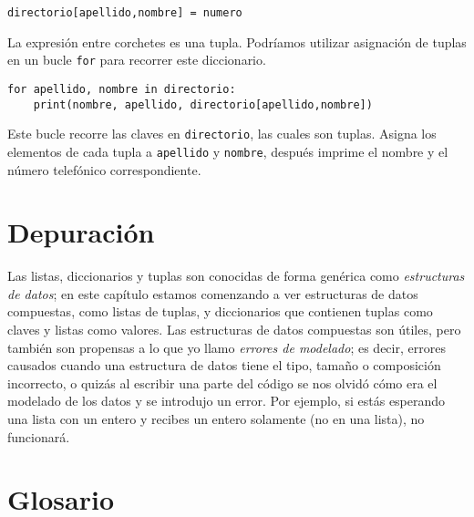 \begin{Verbatim}[frame=single]
directorio[apellido,nombre] = numero
\end{Verbatim}


La expresión entre corchetes es una tupla. Podríamos utilizar asignación
de tuplas en un bucle \texttt{for} para recorrer este diccionario.


\begin{Verbatim}[frame=single]
for apellido, nombre in directorio:
    print(nombre, apellido, directorio[apellido,nombre])
\end{Verbatim}


Este bucle recorre las claves en \texttt{directorio}, las cuales son
tuplas. Asigna los elementos de cada tupla a \texttt{apellido} y
\texttt{nombre}, después imprime el nombre y el número telefónico
correspondiente.








\hypertarget{depuraciuxf3n}{%
\section{Depuración}\label{depuraciuxf3n}}

  

Las listas, diccionarios y tuplas son conocidas de forma genérica como
\emph{estructuras de datos}; en este capítulo estamos comenzando a ver
estructuras de datos compuestas, como listas de tuplas, y diccionarios
que contienen tuplas como claves y listas como valores. Las estructuras
de datos compuestas son útiles, pero también son propensas a lo que yo
llamo \emph{errores de modelado}; es decir, errores causados cuando una
estructura de datos tiene el tipo, tamaño o composición incorrecto, o
quizás al escribir una parte del código se nos olvidó cómo era el
modelado de los datos y se introdujo un error. Por ejemplo, si estás
esperando una lista con un entero y recibes un entero solamente (no en
una lista), no funcionará.

\hypertarget{glosario}{%
\section{Glosario}\label{glosario}}

